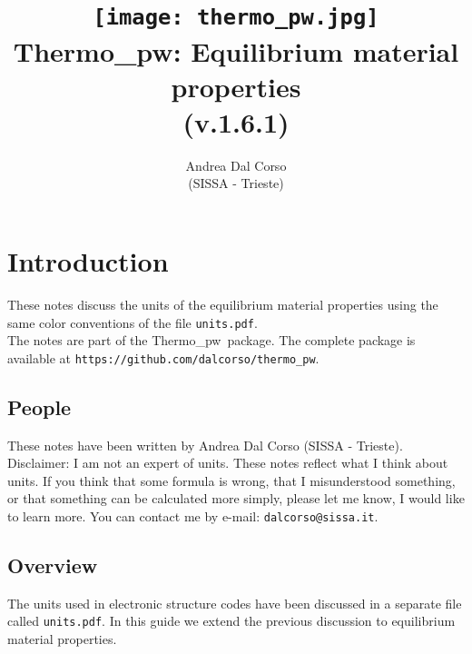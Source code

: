 \documentclass[12pt,a4paper,twoside]{report}
\def\version{1.6.1}
\def\tpw{{\sc Thermo\_pw}}
\begin{document}
 

\author{Andrea Dal Corso \\ (SISSA - Trieste)}
\date{}

\title{
  \texttt{[image: thermo\_pw.jpg]} \\
  \vspace{3truecm}
  \Huge \color{dark-blue} {\sc Thermo\_pw}: Equilibrium material properties \\ (v.\version)
}

\maketitle

\newpage

\tableofcontents

\newpage

{\color{dark-blue}\chapter{Introduction}}
\color{black}

These notes discuss the units of the equilibrium material properties
using the same color conventions of the file \texttt{units.pdf}.\\
The notes are part of the \tpw\ package. The complete package is
available at \texttt{https://github.com/dalcorso/thermo\_pw}.


\newpage
{\color{coral}\section{People}}
\color{black}

These notes have been written by Andrea Dal Corso (SISSA - Trieste). \\
Disclaimer: I am not an expert of units. 
These notes reflect what I think about units.
If you think that some formula is wrong, that I misunderstood something, or 
that something can be calculated more simply, please let me know, I would 
like to learn more. 
You can contact me by e-mail: \texttt{dalcorso@sissa.it}. 

\newpage
{\color{coral}\section{Overview}}
\color{black}
The units used in electronic structure codes have been
discussed in a separate file called \texttt{units.pdf}. In this guide
we extend the previous discussion to equilibrium material properties.
\end{document}
